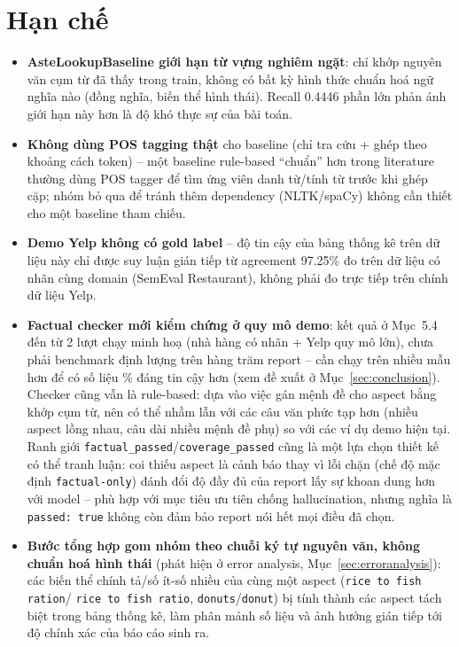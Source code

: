 \documentclass[11pt,a4paper]{article}
\begin{document}
\clearpage
\section{Hạn chế}

\begin{itemize}
    \item \textbf{AsteLookupBaseline giới hạn từ vựng nghiêm ngặt}: chỉ
        khớp nguyên văn cụm từ đã thấy trong train, không có bất kỳ hình
        thức chuẩn hoá ngữ nghĩa nào (đồng nghĩa, biến thể hình thái).
        Recall 0.4446 phần lớn phản ánh giới hạn này hơn là độ khó thực sự
        của bài toán.
    \item \textbf{Không dùng POS tagging thật} cho baseline (chỉ tra cứu
        + ghép theo khoảng cách token) -- một baseline rule-based
        ``chuẩn'' hơn trong literature thường dùng POS tagger để tìm ứng
        viên danh từ/tính từ trước khi ghép cặp; nhóm bỏ qua để tránh thêm
        dependency (NLTK/spaCy) không cần thiết cho một baseline tham
        chiếu.
    \item \textbf{Demo Yelp không có gold label} -- độ tin cậy của bảng
        thống kê trên dữ liệu này chỉ được suy luận gián tiếp từ agreement
        97.25\% đo trên dữ liệu có nhãn cùng domain (SemEval Restaurant),
        không phải đo trực tiếp trên chính dữ liệu Yelp.
    \item \textbf{Factual checker mới kiểm chứng ở quy mô demo}: kết quả
        ở Mục~5.4 đến từ 2 lượt chạy minh hoạ (nhà hàng có nhãn + Yelp
        quy mô lớn), chưa phải benchmark định lượng trên hàng trăm report
        -- cần chạy trên nhiều mẫu hơn để có số liệu \% đáng tin cậy hơn
        (xem đề xuất ở Mục~\ref{sec:conclusion}). Checker cũng vẫn là
        rule-based: dựa vào việc gán mệnh đề cho aspect bằng khớp cụm từ,
        nên có thể nhầm lẫn với các câu văn phức tạp hơn (nhiều aspect
        lồng nhau, câu dài nhiều mệnh đề phụ) so với các ví dụ demo hiện
        tại. Ranh giới \texttt{factual\_passed}/\texttt{coverage\_passed}
        cũng là một lựa chọn thiết kế có thể tranh luận: coi thiếu aspect
        là cảnh báo thay vì lỗi chặn (chế độ mặc định \texttt{factual-only})
        đánh đổi độ đầy đủ của report lấy sự khoan dung hơn với model --
        phù hợp với mục tiêu ưu tiên chống hallucination, nhưng nghĩa là
        \texttt{passed: true} không còn đảm bảo report nói hết mọi điều
        đã chọn.
    \item \textbf{Bước tổng hợp gom nhóm theo chuỗi ký tự nguyên văn,
        không chuẩn hoá hình thái} (phát hiện ở error analysis,
        Mục~\ref{sec:erroranalysis}): các biến thể chính tả/số ít-số
        nhiều của cùng một aspect (\texttt{rice to fish ration}/%
        \texttt{rice to fish ratio}, \texttt{donuts}/\texttt{donut}) bị
        tính thành các aspect tách biệt trong bảng thống kê, làm phân
        mảnh số liệu và ảnh hưởng gián tiếp tới độ chính xác của báo cáo
        sinh ra.
\end{itemize}
\end{document}
